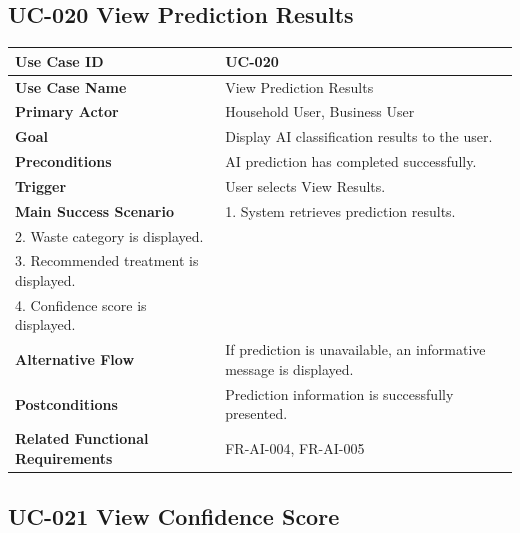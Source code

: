 \subsection{UC-020 View Prediction Results}

\begin{longtable}{|p{4cm}|p{10cm}|}

\hline
\textbf{Use Case ID} &
UC-020 \\
\hline

\textbf{Use Case Name} &
View Prediction Results \\
\hline

\textbf{Primary Actor} &
Household User, Business User \\
\hline

\textbf{Goal} &
Display AI classification results to the user. \\
\hline

\textbf{Preconditions} &
AI prediction has completed successfully. \\
\hline

\textbf{Trigger} &
User selects View Results. \\
\hline

\textbf{Main Success Scenario} &
1. System retrieves prediction results.\\
2. Waste category is displayed.\\
3. Recommended treatment is displayed.\\
4. Confidence score is displayed.\\
\hline

\textbf{Alternative Flow} &
If prediction is unavailable, an informative message is displayed.\\
\hline

\textbf{Postconditions} &
Prediction information is successfully presented.\\
\hline

\textbf{Related Functional Requirements} &
FR-AI-004, FR-AI-005 \\
\hline

\end{longtable}

\subsection{UC-021 View Confidence Score}

